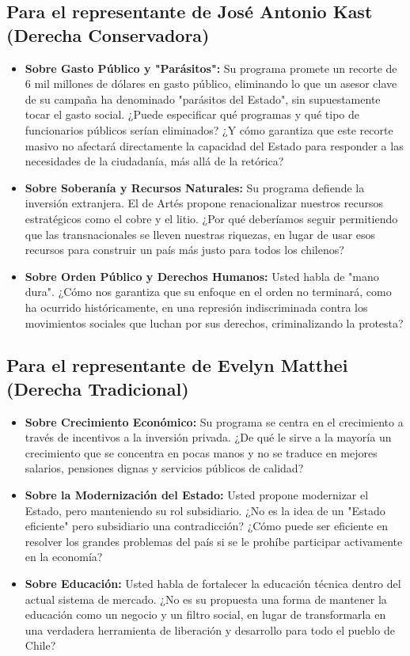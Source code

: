 \documentclass[a4paper, 11pt]{article}
\begin{document}
\subsection{Para el representante de José Antonio Kast (Derecha Conservadora)}
\begin{itemize}
    \item \textbf{Sobre Gasto Público y "Parásitos":} Su programa promete un recorte de 6 mil millones de dólares en gasto público, eliminando lo que un asesor clave de su campaña ha denominado "parásitos del Estado", sin supuestamente tocar el gasto social. ¿Puede especificar qué programas y qué tipo de funcionarios públicos serían eliminados? ¿Y cómo garantiza que este recorte masivo no afectará directamente la capacidad del Estado para responder a las necesidades de la ciudadanía, más allá de la retórica?

    \item \textbf{Sobre Soberanía y Recursos Naturales:} Su programa defiende la inversión extranjera. El de Artés propone renacionalizar nuestros recursos estratégicos como el cobre y el litio. ¿Por qué deberíamos seguir permitiendo que las transnacionales se lleven nuestras riquezas, en lugar de usar esos recursos para construir un país más justo para todos los chilenos?

    \item \textbf{Sobre Orden Público y Derechos Humanos:} Usted habla de "mano dura". ¿Cómo nos garantiza que su enfoque en el orden no terminará, como ha ocurrido históricamente, en una represión indiscriminada contra los movimientos sociales que luchan por sus derechos, criminalizando la protesta?
\end{itemize}

\subsection{Para el representante de Evelyn Matthei (Derecha Tradicional)}
\begin{itemize}
    \item \textbf{Sobre Crecimiento Económico:} Su programa se centra en el crecimiento a través de incentivos a la inversión privada. ¿De qué le sirve a la mayoría un crecimiento que se concentra en pocas manos y no se traduce en mejores salarios, pensiones dignas y servicios públicos de calidad?

    \item \textbf{Sobre la Modernización del Estado:} Usted propone modernizar el Estado, pero manteniendo su rol subsidiario. ¿No es la idea de un "Estado eficiente" pero subsidiario una contradicción? ¿Cómo puede ser eficiente en resolver los grandes problemas del país si se le prohíbe participar activamente en la economía?

    \item \textbf{Sobre Educación:} Usted habla de fortalecer la educación técnica dentro del actual sistema de mercado. ¿No es su propuesta una forma de mantener la educación como un negocio y un filtro social, en lugar de transformarla en una verdadera herramienta de liberación y desarrollo para todo el pueblo de Chile?
\end{itemize}
\end{document}
